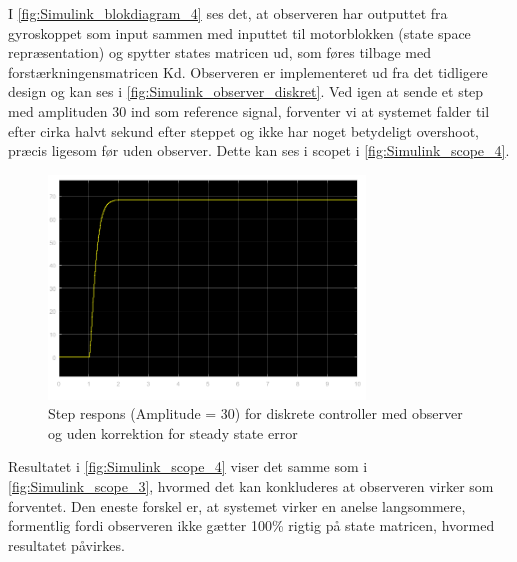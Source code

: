 I \autoref{fig:Simulink_blokdiagram_4} ses det, at observeren har outputtet fra gyroskoppet som input sammen med inputtet til motorblokken (state space repræsentation) og spytter states matricen ud, som føres tilbage med forstærkningensmatricen Kd. Observeren er implementeret ud fra det tidligere design og kan ses i \autoref{fig:Simulink_observer_diskret}. Ved igen at sende et step med amplituden 30 ind som reference signal, forventer vi at systemet falder til efter cirka halvt sekund efter steppet og ikke har noget betydeligt overshoot, præcis ligesom før uden observer. Dette kan ses i scopet i \autoref{fig:Simulink_scope_4}.

\begin{figure}[H]
	\centering
	\includegraphics[width = 0.75\textwidth]{figur/Simulink_scope_4}
	\caption{Step respons (Amplitude = 30) for diskrete controller med observer og uden korrektion for steady state error}
	\label{fig:Simulink_scope_4}
\end{figure}

Resultatet i \autoref{fig:Simulink_scope_4} viser det samme som i \autoref{fig:Simulink_scope_3}, hvormed det kan konkluderes at observeren virker som forventet. Den eneste forskel er, at systemet virker en anelse langsommere, formentlig fordi observeren ikke gætter 100\% rigtig på state matricen, hvormed resultatet påvirkes.
 





